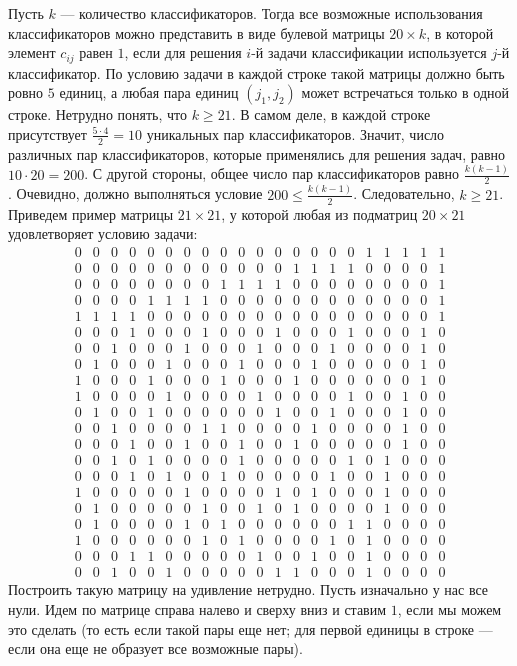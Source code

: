 \documentclass{article}
\begin{document}
Пусть $k$ --- количество классификаторов. Тогда все возможные использования классификаторов можно представить в виде булевой матрицы $20\times k$,
в которой элемент $c_{ij}$ равен $1$, если для решения $i$-й задачи классификации используется $j$-й классификатор.
По условию задачи в каждой строке такой матрицы должно быть ровно $5$ единиц, а любая пара единиц $(j_1,j_2)$ может встречаться только в одной строке.
Нетрудно понять, что $k \geqslant 21$. В самом деле, в каждой строке присутствует $\frac{5\cdot 4}{2} = 10$ уникальных пар классификаторов.
Значит, число различных пар классификаторов, которые применялись для решения задач, равно $10\cdot 20 = 200$. С другой стороны, общее число пар классификаторов равно $\frac{k(k-1)}{2}$.
Очевидно, должно выполняться условие $200 \leqslant \frac{k(k-1)}{2}$. Следовательно, $k \geqslant 21$. Приведем пример матрицы $21\times 21$, у которой любая из подматриц $20\times 21$ удовлетворяет условию задачи: 
\setcounter{MaxMatrixCols}{21}
$$\begin{matrix}
0&0&0&0&0&0&0&0&0&0&0&0&0&0&0&0&1&1&1&1&1\\
0&0&0&0&0&0&0&0&0&0&0&0&1&1&1&1&0&0&0&0&1\\
0&0&0&0&0&0&0&0&1&1&1&1&0&0&0&0&0&0&0&0&1\\
0&0&0&0&1&1&1&1&0&0&0&0&0&0&0&0&0&0&0&0&1\\
1&1&1&1&0&0&0&0&0&0&0&0&0&0&0&0&0&0&0&0&1\\
0&0&0&1&0&0&0&1&0&0&0&1&0&0&0&1&0&0&0&1&0\\
0&0&1&0&0&0&1&0&0&0&1&0&0&0&1&0&0&0&0&1&0\\
0&1&0&0&0&1&0&0&0&1&0&0&0&1&0&0&0&0&0&1&0\\
1&0&0&0&1&0&0&0&1&0&0&0&1&0&0&0&0&0&0&1&0\\
1&0&0&0&0&1&0&0&0&0&1&0&0&0&0&1&0&0&1&0&0\\
0&1&0&0&1&0&0&0&0&0&0&1&0&0&1&0&0&0&1&0&0\\
0&0&1&0&0&0&0&1&1&0&0&0&0&1&0&0&0&0&1&0&0\\
0&0&0&1&0&0&1&0&0&1&0&0&1&0&0&0&0&0&1&0&0\\
0&0&1&0&1&0&0&0&0&1&0&0&0&0&0&1&0&1&0&0&0\\
0&0&0&1&0&1&0&0&1&0&0&0&0&0&1&0&0&1&0&0&0\\
1&0&0&0&0&0&1&0&0&0&0&1&0&1&0&0&0&1&0&0&0\\
0&1&0&0&0&0&0&1&0&0&1&0&1&0&0&0&0&1&0&0&0\\
0&1&0&0&0&0&1&0&1&0&0&0&0&0&0&1&1&0&0&0&0\\
1&0&0&0&0&0&0&1&0&1&0&0&0&0&1&0&1&0&0&0&0\\
0&0&0&1&1&0&0&0&0&0&1&0&0&1&0&0&1&0&0&0&0\\
0&0&1&0&0&1&0&0&0&0&0&1&1&0&0&0&1&0&0&0&0
\end{matrix}$$
Построить такую матрицу на удивление нетрудно. Пусть изначально у нас все нули. Идем по матрице справа налево и сверху вниз и ставим $1$, если мы можем это сделать (то есть если такой пары еще нет; для первой единицы в строке --- если она еще не образует все возможные пары).
\end{document}
